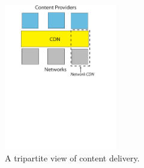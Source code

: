 
\begin{figure}
\centerline{\includegraphics[height=2.5in]{ncdnpaper/NetworkCDN}}
\vspace*{-1.35in}
\caption{A tripartite view of content delivery.}
\vspace*{-0.25in}
\label{fig:networkCDN}
\end{figure}

